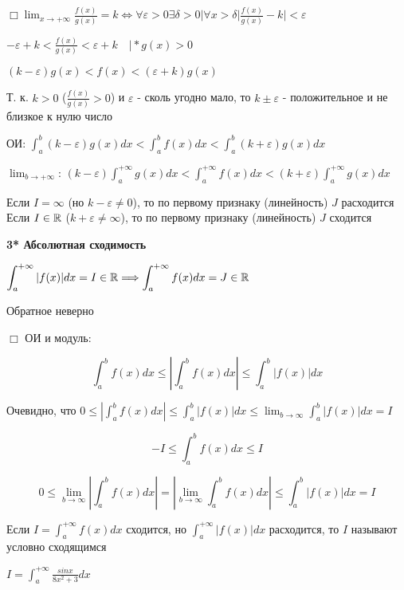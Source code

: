 \documentclass[12pt]{article}
\begin{document}
    $\displaystyle \Box \lim_{x\to+\infty} \frac{f(x)}{g(x)} = k \Longleftrightarrow \forall \varepsilon > 0 \exists \delta > 0 | \forall x > \delta |\frac{f(x)}{g(x)} - k| < \varepsilon $

    $\displaystyle -\varepsilon + k < \frac{f(x)}{g(x)} < \varepsilon + k \quad \Big| * g(x) > 0$

    $\displaystyle (k - \varepsilon)g(x) < f(x) < (\varepsilon + k)g(x)$

    Т. к. $k > 0$ ($\frac{f(x)}{g(x)} > 0$) и $\varepsilon$ - сколь угодно мало, то $k \pm \varepsilon$ - положительное и не близкое к нулю число

    ОИ: $\displaystyle \int^{b}_{a} (k - \varepsilon)g(x) dx < \int^{b}_{a} f(x) dx < \int^{b}_{a} (k + \varepsilon)g(x) dx$

    $\displaystyle \lim_{b \to +\infty}$: $\displaystyle (k - \varepsilon) \int^{+\infty}_{a} g(x) dx < \int^{+\infty}_{a} f(x) dx < (k + \varepsilon) \int^{+\infty}_{a} g(x) dx$

    Если $I = \infty$ (но $k - \varepsilon \neq 0$), то по первому признаку (линейность) $J$ расходится
    Если $I \in \mathbb{R}$ ($k + \varepsilon \neq \infty$), то по первому признаку (линейность) $J$ сходится

    \hypertarget{improperintegralabsoluteconvergence}{}
    \textbf{3* Абсолютная сходимость}

    $\displaystyle \int^{+\infty}_{a} |f(x)| dx = I \in \mathbb{R} \Longrightarrow \int^{+\infty}_{a} f(x) dx = J \in \mathbb{R}$

    \Nota Обратное неверно

    $\Box$ ОИ и модуль:

    \[\int^{b}_{a} f(x) dx \leq |\int^{b}_{a} f(x) dx| \leq \int^{b}_{a} |f(x)| dx\]

    Очевидно, что $\displaystyle 0 \leq |\int^{b}_{a} f(x) dx| \leq \int^{b}_{a} |f(x)| dx \leq \lim_{b \to \infty} \int^{b}_{a} |f(x)| dx = I$

    \[-I \leq \int^{b}_{a} f(x) dx \leq I\]

    \[0 \leq \lim_{b \to \infty}|\int^{b}_{a} f(x) dx| = |\lim_{b \to \infty} \int^{b}_{a} f(x) dx| \leq \int^{b}_{a} |f(x)| dx = I\]

    \Nota \hypertarget{improperintegralconditionalconvergence}{}Если $\displaystyle I = \int^{+\infty}_{a} f(x) dx$ сходится, но $\displaystyle \int^{+\infty}_{a} |f(x)| dx$ расходится, то $I$ называют условно сходящимся

    \Ex $\displaystyle I = \int^{+\infty}_{a} \frac{sinx}{8x^2 + 3} dx$
\end{document}
